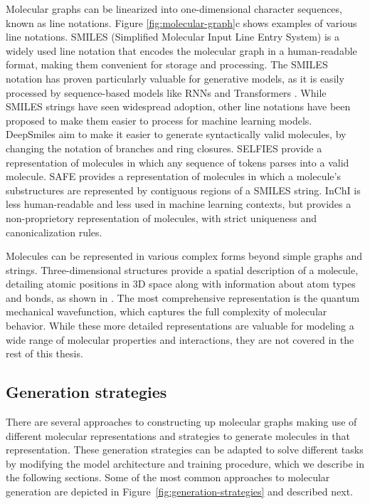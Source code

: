 Molecular graphs can be linearized into one-dimensional character sequences, known as line
notations. Figure \ref{fig:molecular-graph}c shows examples of various line notations. SMILES
(Simplified Molecular Input Line Entry System) \citep{weiningerSMILESChemicalLanguage1988} is a
widely used line notation that encodes the molecular graph in a human-readable format, making them
convenient for storage and processing. The SMILES notation has proven particularly valuable for
generative models, as it is easily processed by sequence-based models like \acp{RNN} and
Transformers \citep{vaswaniAttentionAllYou2017}. While SMILES strings have seen widespread adoption,
other line notations have been proposed to make them easier to process for machine learning
models. DeepSmiles \citep{oboyleDeepSMILESAdaptationSMILES2018} aim to make it easier to generate
syntactically valid molecules, by changing the notation of branches and ring closures. SELFIES
\citep{krennSELFIESFutureMolecular2022} provide a representation of molecules in which any sequence
of tokens parses into a valid molecule. SAFE \citep{noutahiGottaBeSAFE2023} provides a
representation of molecules in which a molecule's substructures are represented by contiguous regions of a
SMILES string. InChI \citep{hellerInChIIUPACInternational2015} is less human-readable and less used
in machine learning contexts, but provides a non-proprietory representation of molecules, with
strict uniqueness and canonicalization rules.

Molecules can be represented in various complex forms beyond simple graphs and strings.
Three-dimensional structures provide a spatial description of a molecule, detailing atomic positions
in 3D space along with information about atom types and bonds, as shown in
. The most comprehensive representation is the quantum mechanical
wavefunction, which captures the full complexity of molecular behavior. While these more
detailed representations are valuable for modeling a wide range of molecular properties and
interactions, they are not covered in the rest of this thesis.

\subsection{Generation strategies}
There are several approaches to constructing up molecular graphs making use of different molecular
representations and strategies to generate molecules in that representation. These generation
strategies can be adapted to solve different tasks by modifying the model architecture and
training procedure, which we describe in the following sections. Some of the most common approaches
to molecular generation are depicted in Figure~\ref{fig:generation-strategies} and described next.

